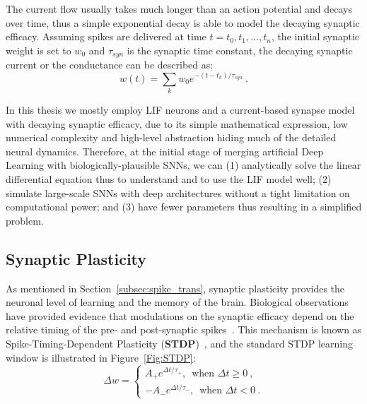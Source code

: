 The current flow usually takes much longer than an action potential and decays over time, thus a simple exponential decay is able to model the decaying synaptic efficacy.
Assuming spikes are delivered at time $t={t_0, t_1, ..., t_n}$, the initial synaptic weight is set to $w_0$ and $\tau_{syn}$ is the synaptic time constant, the decaying synaptic current or the conductance can be described as:
\begin{equation}
w(t) = \sum_k w_0 e^{-(t-t_k)/\tau_{syn}}~.
\end{equation}

In this thesis we mostly employ LIF neurons and a current-based synapse model with decaying synaptic efficacy, due to its simple mathematical expression, low numerical complexity and high-level abstraction hiding much of the detailed neural dynamics.
Therefore, at the initial stage of merging artificial Deep Learning with biologically-plausible SNNs, we can (1) analytically solve the linear differential equation thus to understand and to use the LIF model well; (2) simulate large-scale SNNs with deep architectures without a tight limitation on computational power; and (3) have fewer parameters thus resulting in a simplified problem.


\subsection{Synaptic Plasticity}
\label{subsec:STDP}
As mentioned in Section~\ref{subsec:spike_trans}, synaptic plasticity provides the neuronal level of learning and the memory of the brain.
Biological observations have provided evidence that modulations on the synaptic efficacy depend on the relative timing of the pre- and post-synaptic spikes~\citep{bi1998synaptic}.
This mechanism is known as Spike-Timing-Dependent Plasticity (\textbf{STDP})~\citep{song2000competitive}, and the standard STDP learning window is illustrated in Figure~\ref{Fig:STDP}:
\begin{equation}
\Delta w = \left\{
\begin{aligned}
A_+ e^{\Delta t/\tau_+} \textrm{,~~when~} \Delta t \geq 0~, \\
-A_- e^{\Delta t/\tau_-} \textrm{,~~when~} \Delta t < 0~.
\end{aligned}
\right.
\label{equ:stdp}
\end{equation}

